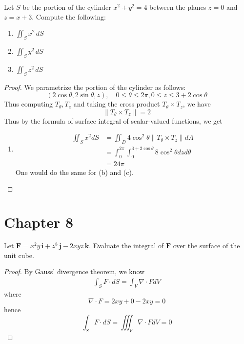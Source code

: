 \documentclass[openany]{book}
\begin{document}
\begin{prob}[27]
    Let \( S \) be the portion of the cylinder \( x^2 + y^2 = 4 \) between the planes \( z = 0 \) and \( z = x + 3 \). Compute the following:
    
    \begin{enumerate}
        \item[(a)] \( \iint_S x^2 \, dS \)
        \item[(b)] \( \iint_S y^2 \, dS \)
        \item[(c)] \( \iint_S z^2 \, dS \)
    \end{enumerate}
\end{prob}
\begin{proof}
    We parametrize the portion of the cylinder as follows:
    \begin{equation*}
        (2\cos\theta, 2\sin\theta, z), \quad 0\leq\theta\leq 2\pi, 0\leq z\leq 3+2\cos\theta
    \end{equation*}
    Thus computing $T_\theta, T_z$ and taking the cross product $T_\theta\times T_z$, we have 
    \begin{equation*}
        \|T_\theta\times T_z\|=2
    \end{equation*}
    Thus by the formula of surface integral of scalar-valued functions, we get 
    \begin{enumerate}
        \item[(a)] 
        \begin{align*}
            \iint_Sx^2dS&=\iint_D4\cos^2\theta\|T_\theta\times T_z\| dA\\
            &=\int_0^{2\pi}\int_{0}^{3+2\cos\theta}8\cos^2\theta dzd\theta\\
            &=24\pi
        \end{align*}
        One would do the same for (b) and (c).
    \end{enumerate}
\end{proof}



\section{Chapter 8}

\begin{prob}[3]
    Let \( \mathbf{F} = x^2 y \, \mathbf{i} + z^8 \, \mathbf{j} - 2xyz \, \mathbf{k} \). Evaluate the integral of \( \mathbf{F} \) over the surface of the unit cube.
\end{prob}
\begin{proof}
    By Gauss' divergence theorem, we know
    \begin{align*}
        \int_SF\cdot dS=\int_{V}\nabla\cdot FdV
    \end{align*}
    where 
    \begin{equation*}
        \nabla\cdot F=2xy+0-2xy=0
    \end{equation*}
    hence 
    \begin{equation*}
        \int_SF\cdot dS=\iiint_{V}\nabla\cdot FdV=0
    \end{equation*}
\end{proof}
\end{document}
